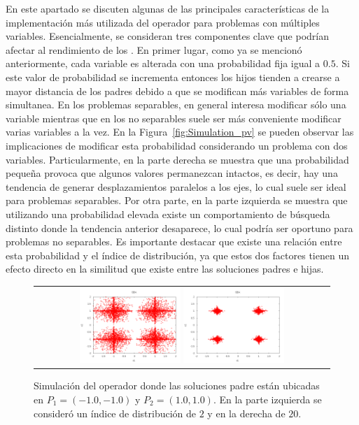 En este apartado se discuten algunas de las principales características de la implementación más utilizada del operador \SBX{} para problemas con
múltiples variables.
%
Esencialmente, se consideran tres componentes clave que podrían afectar al rendimiento de los \MOEAS{}.
%
En primer lugar, como ya se mencionó anteriormente, cada variable es alterada con una probabilidad fija igual a $0.5$.
%
Si este valor de probabilidad se incrementa entonces los hijos tienden a crearse a mayor distancia de los padres debido a que se 
modifican más variables de forma simultanea.
%
En los problemas separables, en general interesa modificar sólo una variable mientras que en los no separables suele ser más conveniente
modificar varias variables a la vez.
%
En la Figura~\ref{fig:Simulation_pv} se pueden observar las implicaciones de modificar esta probabilidad considerando un problema con dos variables.
%
Particularmente, en la parte derecha se muestra que una probabilidad pequeña provoca que algunos valores permanezcan intactos, es decir,
hay una tendencia de generar desplazamientos paralelos a los ejes, lo cual suele ser ideal para problemas separables.
%
Por otra parte, en la parte izquierda se muestra que utilizando una probabilidad elevada existe un comportamiento de búsqueda distinto donde la tendencia anterior desaparece, 
lo cual podría ser oportuno para problemas no separables.
%
Es importante destacar que existe una relación entre esta probabilidad y el índice de distribución, ya que estos dos factores tienen un efecto directo en la similitud 
que existe entre las soluciones padres e hijas.
%
\begin{figure}[t]
\centering
\begin{tabular}{c}
   \includegraphics[width=0.35\textwidth]{img/Operadores/SBX_eta_2.png}  %
   \includegraphics[width=0.35\textwidth]{img/Operadores/SBX_eta_20.png} 
\end{tabular}
\caption{Simulación del operador \SBX{} donde las soluciones padre están ubicadas en $P_1=(-1.0, -1.0)$ y $P_2=(1.0, 1.0)$. En la parte izquierda se consideró un índice de distribución de $2$ y en la derecha de $20$.}
\label{fig:Simulation_Case_3}
\end{figure}

